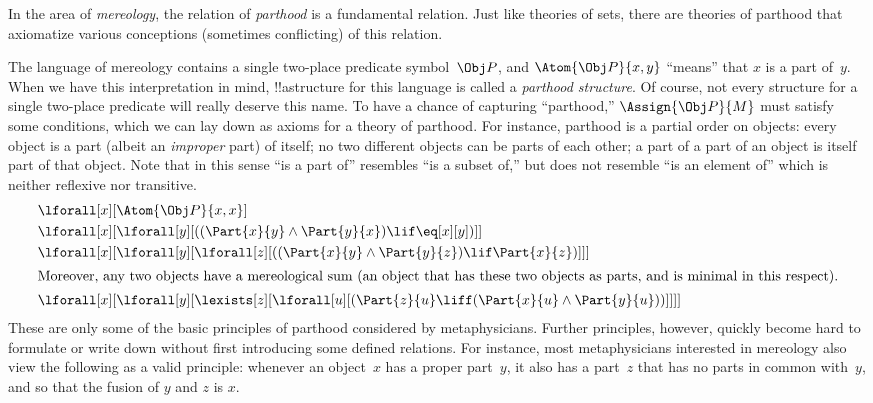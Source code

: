 \begin{ex}
In the area of \emph{mereology}, the relation of \emph{parthood} is a
fundamental relation.  Just like theories of sets, there are theories
of parthood that axiomatize various conceptions (sometimes
conflicting) of this relation.

The language of mereology contains a single two-place predicate
symbol~$\Obj P$, and $\Atom{\Obj P}{x, y}$ ``means'' that $x$ is a
part of~$y$.  When we have this interpretation in mind, !!a{structure}
for this language is called a \emph{parthood structure}.  Of course,
not every structure for a single two-place predicate will really
deserve this name.  To have a chance of capturing ``parthood,''
$\Assign{\Obj P}{M}$ must satisfy some conditions, which we can lay
down as axioms for a theory of parthood.  For instance, parthood is a
partial order on objects: every object is a part (albeit an
\emph{improper} part) of itself; no two different objects can be parts
of each other; a part of a part of an object is itself part of that
object.  Note that in this sense ``is a part of'' resembles ``is a
subset of,'' but does not resemble ``is an element of'' which is
neither reflexive nor transitive.
\begin{align*}
& \lforall[x][\Atom{\Obj P}{x,x}] \\
& \lforall[x][\lforall[y][((\Part{x}{y} \land \Part{y}{x})
      \lif \eq[x][y])]] \\
& \lforall[x][\lforall[y][\lforall[z][((\Part{x}{y} \land
        \Part{y}{z}) \lif \Part{x}{z})]]]\\
\intertext{Moreover, any two objects have a mereological sum (an object that has
  these two objects as parts, and is minimal in this respect).}  &
\lforall[x][\lforall[y][\lexists[z][\lforall[u][(\Part{z}{u} \liff
        (\Part{x}{u} \land \Part{y}{u}))]]]]
\end{align*}
These are only some of the basic principles of parthood considered by
metaphysicians.  Further principles, however, quickly become hard to
formulate or write down without first introducing some defined
relations.  For instance, most metaphysicians interested in mereology
also view the following as a valid principle: whenever an
object~$x$ has a proper part~$y$, it also has a part~$z$ that has no
parts in common with~$y$, and so that the fusion of $y$ and $z$ is
$x$.
\end{ex}






